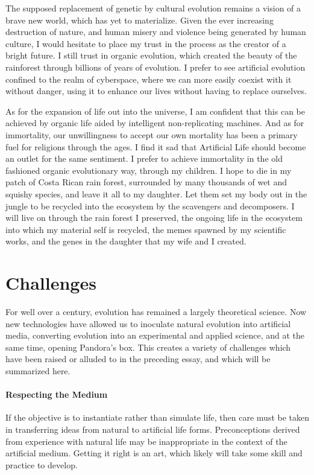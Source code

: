 The supposed replacement of genetic by cultural evolution remains a
vision of a brave new world, which has yet to materialize.  Given
the ever increasing destruction of nature, and human misery and violence
being generated by human culture, I would hesitate to place my trust
in the process as the creator of a bright future.  I still trust in
organic evolution, which created the beauty of the rainforest through
billions of years of evolution.  I prefer to see artificial evolution
confined to the realm of cyberspace, where we can more easily coexist
with it without danger, using it to enhance our lives without having to
replace ourselves.

As for the expansion of life out into the universe, I am confident that
this can be achieved by organic life aided by intelligent non-replicating
machines.  And as for immortality, our unwillingness to accept our own
mortality has been a primary fuel for religions through the ages.  I find
it sad that Artificial Life should become an outlet for the same
sentiment.  I prefer to achieve immortality in the old fashioned
organic evolutionary way, through my children.  I hope to die in my
patch of Costa Rican rain forest, surrounded by many thousands of wet
and squishy species, and leave it all to my daughter.  Let them set
my body out in the jungle to be recycled into the ecosystem by the
scavengers and decomposers.  I will live on through the rain forest I
preserved, the ongoing life in the ecosystem into which my material
self is recycled, the memes spawned by my scientific works, and the
genes in the daughter that my wife and I created.

\section{Challenges}

For well over a century, evolution has remained a largely
theoretical science.  Now new technologies have allowed us
to inoculate natural evolution into artificial media, converting
evolution into an experimental and applied science, and at the
same time, opening Pandora's box.  This creates a variety of
challenges which have been raised or alluded to in the preceding
essay, and which will be summarized here.

\paragraph{Respecting the Medium}

If the objective is to instantiate rather than simulate life, then
care must be taken in transferring ideas from natural to artificial
life forms.  Preconceptions derived from experience with natural life
may be inappropriate in the context of the artificial medium.  Getting
it right is an art, which likely will take some skill and practice to
develop.

